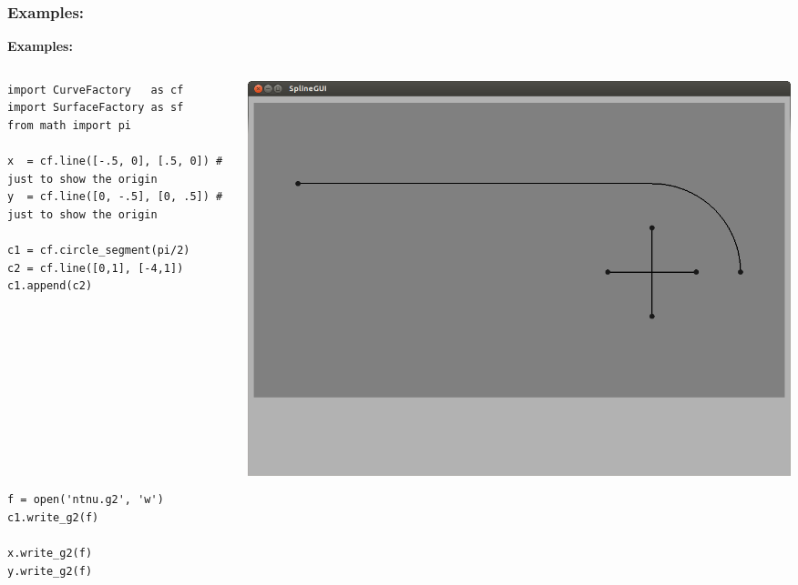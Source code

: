 \documentclass{beamer}
\theoremstyle{plain}
\theoremstyle{definition}
\begin{document}
\begin{frame}[fragile]
\frametitle{Examples:}
\textbf{Examples:}
\begin{columns}
    \begin{column}{.50\linewidth}
        \begin{listing}[H]
            \tiny
            \begin{verbatim}
import CurveFactory   as cf
import SurfaceFactory as sf
from math import pi

x  = cf.line([-.5, 0], [.5, 0]) # just to show the origin
y  = cf.line([0, -.5], [0, .5]) # just to show the origin

c1 = cf.circle_segment(pi/2)
c2 = cf.line([0,1], [-4,1])
c1.append(c2)











f = open('ntnu.g2', 'w')
c1.write_g2(f)

x.write_g2(f)
y.write_g2(f)
            \end{verbatim}
        \end{listing}
    \end{column}
    \begin{column}{.45\linewidth}
        \includegraphics[width=\linewidth]{ntnu1}
    \end{column}
\end{columns}

\end{frame}

\end{document}
